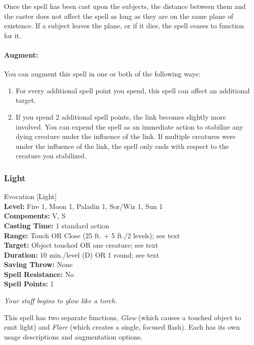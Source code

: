 Once the spell has been cast upon the subjects, the distance between them and the caster does not affect the spell as long as they are on the same plane of existence. 
If a subject leaves the plane, or if it dies, the spell ceases to function for it.

\paragraph{Augment:} You can augment this spell in one or both of the following ways:
\begin{enumerate}
 \item For every additional spell point you spend, this spell can affect an additional target.
 \item If you spend 2 additional spell points, the link becomes slightly more involved. You can expend the spell as an immediate action to stabilize any dying creature under the influence of the link. If multiple creatures were under the influence of the link, the spell only ends with respect to the creature you stabilized.
\end{enumerate}

\subsubsection{Light}
\label{Spell:Light}
Evocation [Light]
\\ \textbf{Level:} Fire 1, Moon 1, Paladin 1, Sor/Wiz 1, Sun 1
\\ \textbf{Components:} V, S
\\ \textbf{Casting Time:} 1 standard action
\\ \textbf{Range:} Touch OR Close (25 ft. + 5 ft./2 levels); see text
\\ \textbf{Target:} Object touched OR one creature; see text
\\ \textbf{Duration:} 10 min./level (D) OR 1 round; see text
\\ \textbf{Saving Throw:} None
\\ \textbf{Spell Resistance:} No
\\ \textbf{Spell Points:} 1

\emph{Your staff begins to glow like a torch.}

This spell has two separate functions, \emph{Glow} (which causes a touched object to emit light) 
and \emph{Flare} (which creates a single, focused flash).
Each has its own usage descriptions and augmentation options.

